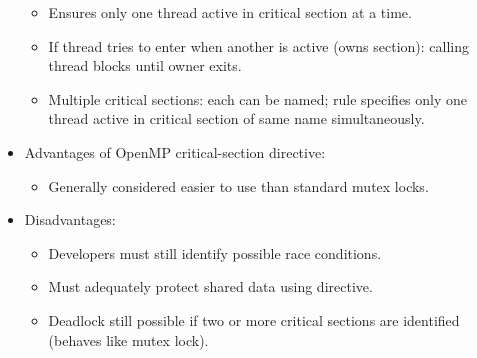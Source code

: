 \begin{itemize}
\begin{itemize}
        \item Ensures only one thread active in critical section at a time.
        \item If thread tries to enter when another is active (owns section): calling thread blocks until owner exits.
        \item Multiple critical sections: each can be named; rule specifies only one thread active in critical section of same name simultaneously.
    \end{itemize}
    \item Advantages of OpenMP critical-section directive:
    \begin{itemize}
        \item Generally considered easier to use than standard mutex locks.
    \end{itemize}
    \item Disadvantages:
    \begin{itemize}
        \item Developers must still identify possible race conditions.
        \item Must adequately protect shared data using directive.
        \item Deadlock still possible if two or more critical sections are identified (behaves like mutex lock).
    \end{itemize}
\end{itemize}

